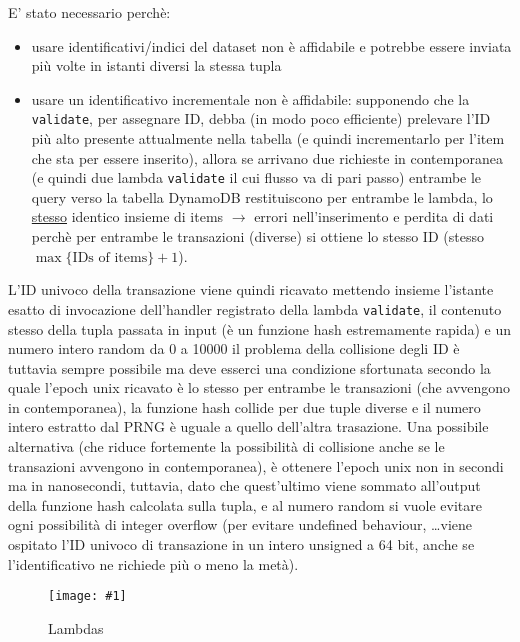\documentclass[
    sigconf, 
    screen=false, 
    acmthm=false, 
    nonacm
]{acmart}
\def\maxpicwidth{8.15cm}
\newcommand{\pichere}[3] {
\begin{figure}[H]
\centering
\texttt{[image: \#1]}
\caption{#3}
\end{figure}
}
\begin{document}
E' stato necessario perchè:
\begin{itemize}
    \item usare identificativi/indici del dataset non è affidabile e potrebbe essere inviata più volte in istanti
    diversi la stessa tupla
    \item usare un identificativo incrementale non è affidabile: supponendo che la \texttt{validate}, per 
    assegnare ID, debba (in modo poco efficiente) prelevare l'ID più alto presente attualmente nella tabella (e 
    quindi incrementarlo per l'item che sta per essere inserito), allora se arrivano
    due richieste in contemporanea (e quindi due lambda \texttt{validate} il cui flusso va di pari passo) entrambe le query 
    verso la tabella DynamoDB restituiscono per entrambe le lambda, lo \underline{stesso} identico insieme di items 
    $\rightarrow$ errori nell'inserimento e perdita di dati perchè per entrambe le transazioni (diverse) si ottiene 
    lo stesso ID (stesso $\max \{\text{IDs of items}\} + 1$).
\end{itemize}
L'ID univoco della transazione viene quindi ricavato mettendo insieme l'istante esatto di invocazione dell'handler
registrato della lambda \texttt{validate}, il contenuto stesso della tupla passata in input (è un funzione hash estremamente rapida) 
e un numero intero random da 0 a 10000
il problema della collisione degli ID è tuttavia sempre possibile ma deve esserci una condizione sfortunata secondo 
la quale l'epoch unix ricavato è lo stesso per entrambe le transazioni (che avvengono in contemporanea), la 
funzione hash collide per due tuple 
diverse e il numero intero estratto dal PRNG è uguale a quello dell'altra trasazione. Una possibile alternativa 
(che riduce fortemente la possibilità di collisione anche se le transazioni avvengono in contemporanea), è 
ottenere l'epoch unix non in secondi ma in nanosecondi, tuttavia, dato che quest'ultimo viene sommato all'output 
della funzione hash calcolata sulla tupla, e al numero random si vuole evitare ogni possibilità di integer overflow 
(per evitare undefined behaviour, \dots viene ospitato l'ID univoco di transazione in un intero unsigned a 64 bit, 
anche se l'identificativo ne richiede più o meno la metà).

\pichere{all-lambdas}{5.5cm}{Lambdas}
\end{document}
